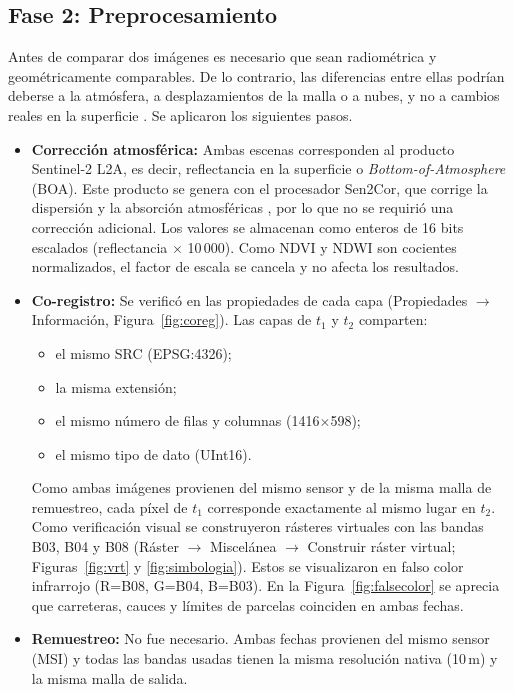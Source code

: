 \documentclass[12pt]{article}
\begin{document}
\subsection{Fase 2: Preprocesamiento}
Antes de comparar dos imágenes es necesario que sean radiométrica y geométricamente comparables. De lo contrario, las diferencias entre ellas podrían deberse a la atmósfera, a desplazamientos de la malla o a nubes, y no a cambios reales en la superficie \parencite{Singh1989}. Se aplicaron los siguientes pasos.
\begin{itemize}
    \item \textbf{Corrección atmosférica:} Ambas escenas corresponden al producto Sentinel-2 L2A, es decir, reflectancia en la superficie o \emph{Bottom-of-Atmosphere} (BOA). Este producto se genera con el procesador Sen2Cor, que corrige la dispersión y la absorción atmosféricas \parencite{MainKnorn2017}, por lo que no se requirió una corrección adicional. Los valores se almacenan como enteros de 16 bits escalados (reflectancia $\times$ 10\,000). Como NDVI y NDWI son cocientes normalizados, el factor de escala se cancela y no afecta los resultados.
    \item \textbf{Co-registro:} Se verificó en las propiedades de cada capa (Propiedades $\rightarrow$ Información, Figura~\ref{fig:coreg}). Las capas de $t_1$ y $t_2$ comparten:
    \begin{itemize}
        \item el mismo SRC (EPSG:4326);
        \item la misma extensión;
        \item el mismo número de filas y columnas (1416$\times$598);
        \item el mismo tipo de dato (UInt16).
    \end{itemize}
    Como ambas imágenes provienen del mismo sensor y de la misma malla de remuestreo, cada píxel de $t_1$ corresponde exactamente al mismo lugar en $t_2$. Como verificación visual se construyeron rásteres virtuales con las bandas B03, B04 y B08 (Ráster $\rightarrow$ Miscelánea $\rightarrow$ Construir ráster virtual; Figuras~\ref{fig:vrt} y \ref{fig:simbologia}). Estos se visualizaron en falso color infrarrojo (R=B08, G=B04, B=B03). En la Figura~\ref{fig:falsecolor} se aprecia que carreteras, cauces y límites de parcelas coinciden en ambas fechas.
    \item \textbf{Remuestreo:} No fue necesario. Ambas fechas provienen del mismo sensor (MSI) y todas las bandas usadas tienen la misma resolución nativa (10\,m) y la misma malla de salida.

\end{itemize}
\end{document}
